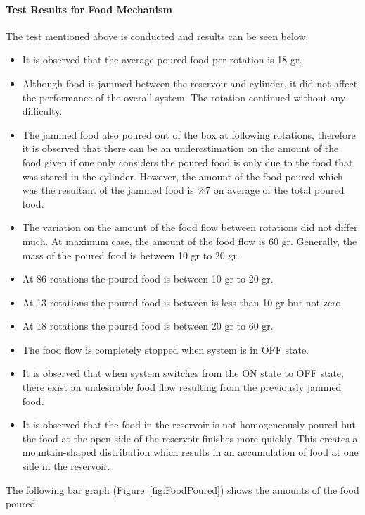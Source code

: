 \paragraph{Test Results for Food Mechanism}
The test mentioned above is conducted and results can be seen below.

\begin{itemize}
    \item It is observed that the average poured food per rotation is 18 gr.
    \item Although food is jammed between the reservoir and cylinder, it did not affect the performance of the overall system. The rotation continued without any difficulty. 
    \item The jammed food also poured out of the box at following rotations, therefore it is observed that there can be an underestimation on the amount of the food given if one only considers the poured food is only due to the food that was stored in the cylinder. However, the amount of the food poured which was the resultant of the jammed food is \%7 on average of the total poured food.
    \item The variation on the amount of the food flow between rotations did not differ much. At maximum case, the amount of the food flow is 60 gr. Generally, the mass of the poured food is between 10 gr to 20 gr. 
    \item At 86 rotations the poured food is between 10 gr to 20 gr. 
    \item At 13 rotations the poured food is between is less than 10 gr but not zero.
    \item At 18 rotations the poured food is between 20 gr to 60 gr. 
    \item The food flow is completely stopped when system is in OFF state.
    \item It is observed that when system switches from the ON state to OFF state, there exist an undesirable food flow resulting from the previously jammed food.
    \item It is observed that the food in the reservoir is not homogeneously poured but the food at the open side of the reservoir finishes more quickly. This creates a mountain-shaped distribution which results in an accumulation of food at one side in the reservoir.    
\end{itemize}
The following bar graph (Figure~\ref{fig:FoodPoured}) shows the amounts of the food poured.
